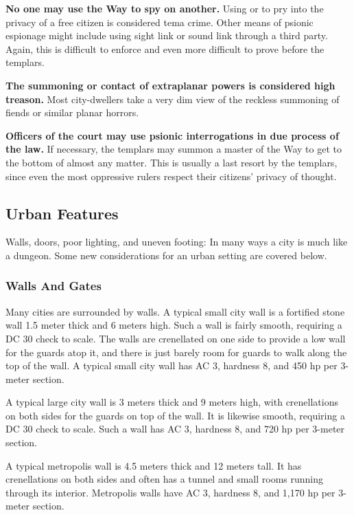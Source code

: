 \begin{itemize*}
\item \textbf{No one may use the Way to spy on another.} Using  or  to pry into the privacy of a free citizen is considered tema crime. Other means of psionic espionage might include using sight link or sound link through a third party. Again, this is difficult to enforce and even more difficult to prove before the templars.

\item \textbf{The summoning or contact of extraplanar powers is considered high treason.} Most city-dwellers take a very dim view of the reckless summoning of fiends or similar planar horrors.

\item \textbf{Officers of the court may use psionic interrogations in due process of the law.} If necessary, the templars may summon a master of the Way to get to the bottom of almost any matter. This is usually a last resort by the templars, since even the most oppressive rulers respect their citizens' privacy of thought. 
\end{itemize*}

\subsection{Urban Features}
Walls, doors, poor lighting, and uneven footing: In many ways a city is much like a dungeon. Some new considerations for an urban setting are covered below.

\subsubsection{Walls And Gates}
Many cities are surrounded by walls. A typical small city wall is a fortified stone wall 1.5 meter thick and 6 meters high. Such a wall is fairly smooth, requiring a DC 30  check to scale. The walls are crenellated on one side to provide a low wall for the guards atop it, and there is just barely room for guards to walk along the top of the wall. A typical small city wall has AC 3, hardness 8, and 450 hp per 3-meter section.

A typical large city wall is 3 meters thick and 9 meters high, with crenellations on both sides for the guards on top of the wall. It is likewise smooth, requiring a DC 30  check to scale. Such a wall has AC 3, hardness 8, and 720 hp per 3-meter section.

A typical metropolis wall is 4.5 meters thick and 12 meters tall. It has crenellations on both sides and often has a tunnel and small rooms running through its interior. Metropolis walls have AC 3, hardness 8, and 1,170 hp per 3-meter section.

